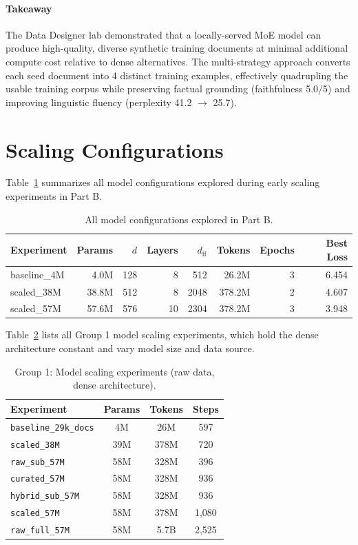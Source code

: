 \documentclass[10pt]{article}
\begin{document}
\paragraph{Takeaway}
The Data Designer lab demonstrated that a locally-served MoE model can produce high-quality, diverse synthetic training documents at minimal additional compute cost relative to dense alternatives. The multi-strategy approach converts each seed document into 4 distinct training examples, effectively quadrupling the usable training corpus while preserving factual grounding (faithfulness 5.0/5) and improving linguistic fluency (perplexity 41.2 $\to$ 25.7).

\section{Scaling Configurations}
\label{app:scaling}

Table~\ref{tab:all_configs} summarizes all model configurations explored during early scaling experiments in Part B.

\begin{table}[H]
\centering
\caption{All model configurations explored in Part B.}
\label{tab:all_configs}
\begin{tabular}{lrrrrrrr}
\toprule
\textbf{Experiment} & \textbf{Params} & $d$ & \textbf{Layers} & $d_\text{ff}$ & \textbf{Tokens} & \textbf{Epochs} & \textbf{Best Loss} \\
\midrule
baseline\_4M & 4.0M & 128 & 8 & 512 & 26.2M & 3 & 6.454 \\
scaled\_38M & 38.8M & 512 & 8 & 2048 & 378.2M & 2 & 4.607 \\
scaled\_57M & 57.6M & 576 & 10 & 2304 & 378.2M & 3 & 3.948 \\
\bottomrule
\end{tabular}
\end{table}

Table~\ref{tab:group1} lists all Group 1 model scaling experiments, which hold the dense architecture constant and vary model size and data source.

\begin{table}[H]
\centering
\caption{Group 1: Model scaling experiments (raw data, dense architecture).}
\label{tab:group1}
\begin{tabular}{lccc}
\toprule
\textbf{Experiment} & \textbf{Params} & \textbf{Tokens} & \textbf{Steps} \\
\midrule
\texttt{baseline\_29k\_docs} & 4M   & 26M   & 597    \\
\texttt{scaled\_38M}         & 39M  & 378M  & 720    \\
\texttt{raw\_sub\_57M}       & 58M  & 328M  & 396    \\
\texttt{curated\_57M}        & 58M  & 328M  & 936    \\
\texttt{hybrid\_sub\_57M}    & 58M  & 328M  & 936    \\
\texttt{scaled\_57M}         & 58M  & 378M  & 1,080  \\
\texttt{raw\_full\_57M}      & 58M  & 5.7B  & 2,525  \\
\bottomrule
\end{tabular}
\end{table}
\end{document}
